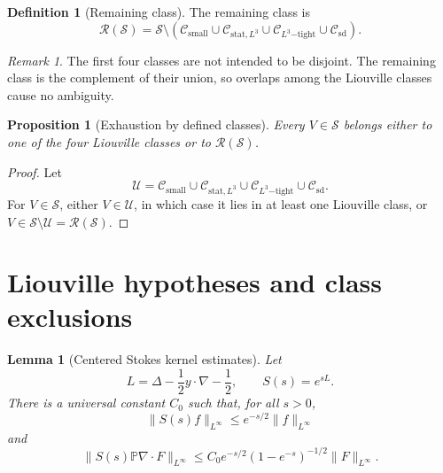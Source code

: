 \documentclass[11pt]{amsart}
\theoremstyle{plain}
\newtheorem{lemma}[lemma]{Lemma}
\newtheorem{proposition}[proposition]{Proposition}
\theoremstyle{definition}
\newtheorem{definition}[definition]{Definition}
\theoremstyle{remark}
\newtheorem{remark}[remark]{Remark}
\numberwithin{equation}{section}
\newcommand{\calS}{\mathcal S}
\newcommand{\calR}{\mathcal R}
\newcommand{\calC}{\mathcal C}
\newcommand{\calU}{\mathcal U}
\begin{document}
\begin{definition}[Remaining class]\label{p1:def:remaining-class}
The remaining class is
\[
   \calR(\calS)
   =
   \calS
   \setminus
   \left(
      \calC_{\mathrm{small}}
      \cup
      \calC_{\mathrm{stat},L^3}
      \cup
      \calC_{L^3\mathrm{-tight}}
      \cup
      \calC_{\mathrm{sd}}
   \right).
\]
\end{definition}

\begin{remark}
The first four classes are not intended to be disjoint.  The remaining class is
the complement of their union, so overlaps among the Liouville classes cause no
ambiguity.
\end{remark}

\begin{proposition}[Exhaustion by defined classes]\label{p1:prop:exhaustion}
Every \(V\in\calS\) belongs either to one of the four Liouville classes or to
\(\calR(\calS)\).
\end{proposition}

\begin{proof}
Let
\[
   \calU=
      \calC_{\mathrm{small}}
      \cup
      \calC_{\mathrm{stat},L^3}
      \cup
      \calC_{L^3\mathrm{-tight}}
      \cup
      \calC_{\mathrm{sd}}.
\]
For \(V\in\calS\), either \(V\in\calU\), in which case it lies in at least one
Liouville class, or \(V\in\calS\setminus\calU=\calR(\calS)\).
\end{proof}

\section{Liouville hypotheses and class exclusions}\label{p1:sec:liouville}

\begin{lemma}[Centered Stokes kernel estimates]
\label{p1:lem:centered-stokes-estimates}
Let
\[
   L=\Delta-\frac12y\cdot\nabla-\frac12,
   \qquad S(s)=e^{sL}.
\]
There is a universal constant \(C_0\) such that, for all \(s>0\),
\[
   \|S(s)f\|_{L^\infty}\le e^{-s/2}\|f\|_{L^\infty}
\]
and
\[
   \|S(s)\mathbb P\nabla\cdot F\|_{L^\infty}
   \le C_0 e^{-s/2}(1-e^{-s})^{-1/2}\|F\|_{L^\infty}.
\]
\end{lemma}
\end{document}
